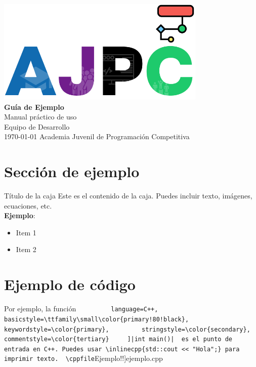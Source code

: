 \documentclass{article}
\newcommand{\cppfile}[2][]{
    \begin{container}{\faCode \space \space  #1}
        
    \end{container}
}
\newcommand{\inlinecpp}[1]{
    \lstinline[
        language=C++,
        basicstyle=\ttfamily\small\color{primary!80!black},
        keywordstyle=\color{primary},
        stringstyle=\color{secondary},
        commentstyle=\color{tertiary}
    ]|#1|
}
\newcommand{\documentTitle}{Guía de Ejemplo}
\newcommand{\documentSubtitle}{Manual práctico de uso}
\newcommand{\documentAuthor}{Equipo de Desarrollo}
\newcommand{\documentDate}{\today}
\begin{document}
\thispagestyle{empty}
\AddToShipoutPictureBG*{}
\begin{center}
    \vspace*{2cm}
    \includegraphics[width=0.75\textwidth]{logo.png} \\[1.5cm]
    {\Huge \textbf{\documentTitle}} \\[0.5cm]
    {\Large \documentSubtitle} \\[1.5cm]
    {\large \documentAuthor} \\[0.5cm]
    {\large \space \space \documentDate}
    \vfill
    {\large Academia Juvenil de Programación Competitiva}
\end{center}
\newpage

\section{Sección de ejemplo}

\begin{container}{Título de la caja}
    Este es el contenido de la caja. Puedes incluir texto, imágenes, ecuaciones, etc. \\
    \textbf{Ejemplo}: \\
    \begin{itemize}
        \item Item 1
        \item Item 2
    \end{itemize}
\end{container}

\section{Ejemplo de código}

Por ejemplo, la función \inlinecpp{int main()} es el punto de entrada en C++.
Puedes usar \inlinecpp{std::cout << "Hola";} para imprimir texto.

\cppfile[Ejemplo!!]{ejemplo.cpp}
\end{document}
